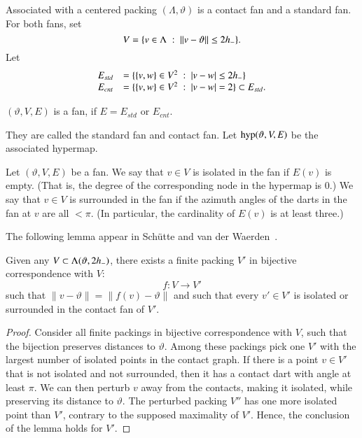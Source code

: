 Associated with a centered packing $(\Lambda,\vartheta)$ is a contact fan and a standard fan.  For both fans, set
$$
V = \{v\in \Lambda\ :\  \|v-\vartheta\|\le 2{h_-}\}.
$$
Let
\begin{equation}\label{eqn:fan-edge}
\begin{array}{lll}
 E_{std} &= \{\{v,w\}\in V^2\ :\  |v-w|\le 2{h_-} \}\\
 E_{cnt} &= \{\{v,w\}\in V^2\ :\  |v-w|= 2 \}\subset E_{std}.
\end{array}
\end{equation}

\begin{lemma}
$(\vartheta,V,E)$ is a fan, if $E=E_{std}$ or $E_{cnt}$.
\end{lemma}
They are called the standard fan and contact fan.
Let ${\operatorname{hyp}}(\vartheta,V,E)$ be the associated hypermap.

\begin{definition}
Let $(\vartheta,V,E)$ be a fan.
We say that $v\in V$ is isolated in the fan if $E(v)$ is empty.
(That is, the degree of the corresponding node in the hypermap is $0$.) We say that $v\in V$ is surrounded in the fan if the azimuth angles of the darts in the fan at $v$ are all $<\pi$.  (In particular, the cardinality of $E(v)$ is at least three.)
\end{definition}

The following lemma appear in Sch\"utte and van der Waerden~\cite{vanderWaerden:1951}.

\begin{lemma}
Given any $V\subset \Lambda(\vartheta,2{h_-})$,
there exists a finite packing $V'$ 
in bijective correspondence with $V$:
$$
f:V\to V'
$$
such that $\|v-\vartheta\| = \|f(v)-\vartheta\|$ and
such that every $v'\in V'$
is isolated or surrounded in the contact fan of $V'$.
\end{lemma}

\begin{proof} Consider all finite packings in 
bijective correspondence with $V$, such that the
bijection preserves distances to $\vartheta$.
Among these packings pick one $V'$ with the largest number
of isolated points in the contact graph.  If there is a point $v\in V'$ that
is not isolated and not surrounded, then it has a contact
dart with angle at least $\pi$.  We can then perturb $v$ away from the contacts, making it isolated, while preserving its distance to $\vartheta$.  The perturbed packing $V''$ has one more isolated point than $V'$, contrary to the supposed maximality of $V'$.  Hence, the conclusion of the 
lemma holds for $V'$.
\end{proof}

